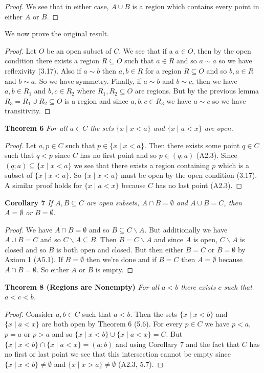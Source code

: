 \documentclass{article}
\begin{document}
\begin{flushleft}
\begin{proof}
We see that in either case, $A \cup B$ is a region which contains every point in either $A$ or $B$.
\end{proof}
We now prove the original result.
\begin{proof}
Let $O$ be an open subset of $C$. We see that if a $a \in O$, then by the open condition there exists a region $R \subseteq O$ such that $a \in R$ and so $a \sim a$ so we have reflexivity (3.17). Also if $a \sim b$ then $a,b \in R$ for a region $R \subseteq O$ and so $b,a \in R$ and $b \sim a$. So we have symmetry. Finally, if $a \sim b$ and $b \sim c$, then we have $a,b \in R_1$ and $b,c \in R_2$ where $R_1,R_2 \subseteq O$ are regions. But by the previous lemma $R_3=R_1 \cup R_2 \subseteq O$ is a region and since $a,b,c \in R_3$ we have $a \sim c$ so we have transitivity.
\end{proof}

\textbf{Theorem 6}
\textsl{For all $a \in C$ the sets $\{x \mid x < a\}$ and $\{x \mid a < x\}$ are open.}
\begin{proof}
Let $a,p \in C$ such that $p \in \{x \mid x < a\}$. Then there exists some point $q \in C$ such that $q<p$ since $C$ has no first point and so $p \in (q;a)$ (A2.3). Since $(q;a) \subseteq \{x \mid x<a\}$ we see that there exists a region containing $p$ which is a subset of $\{x \mid x<a\}$. So $\{x \mid x<a\}$ must be open by the open condition (3.17). A similar proof holds for $\{x \mid a < x\}$ because $C$ has no last point (A2.3).
\end{proof}

\textbf{Corollary 7}
\textsl{If $A,B \subseteq C$ are open subsets, $A \cap B = \emptyset$ and $A \cup B = C$, then $A=\emptyset$ or $B=\emptyset$.}
\begin{proof}
We have $A \cap B = \emptyset$ and so $B \subseteq C \backslash A$. But additionally we have $A \cup B = C$ and so $C \backslash A \subseteq  B$. Then $B = C \backslash A$ and since $A$ is open, $C \backslash A$ is closed and so $B$ is both open and closed. But then either $B = C$ or $B = \emptyset$ by Axiom 1 (A5.1). If $B = \emptyset$ then we're done and if $B=C$ then $A = \emptyset$ because $A \cap B = \emptyset$. So either $A$ or $B$ is empty.
\end{proof}

\textbf{Theorem 8 (Regions are Nonempty)}
\textsl{For all $a<b$ there exists $c$ such that $a<c<b$.}
\begin{proof}
Consider $a,b \in C$ such that $a<b$. Then the sets $\{x \mid x < b\}$ and $\{x \mid a < x\}$ are both open by Theorem 6 (5.6). For every $p \in C$ we have $p<a$, $p=a$ or $p>a$ and so $\{x \mid x < b\} \cup \{x \mid a < x\} = C$. But $\{x \mid x<b\} \cap \{x \mid a<x\}=(a;b)$ and using Corollary 7 and the fact that $C$ has no first or last point we see that this intersection cannot be empty since $\{x \mid x<b\} \neq \emptyset$ and $\{x \mid x>a\} \neq \emptyset$ (A2.3, 5.7).
\end{proof}


\end{flushleft}
\end{document}
